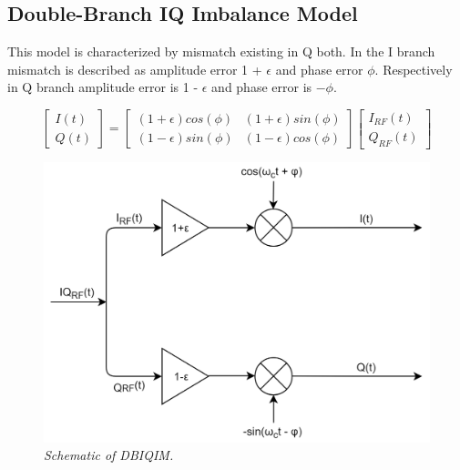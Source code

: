 \documentclass[en,printmode]{mgr}
\begin{document}
		\subsection*{Double-Branch IQ Imbalance Model}
			This model is characterized by mismatch existing in Q both. In the I branch 
			mismatch is described as amplitude error 1 + $\epsilon$ and phase error $\phi$.
			Respectively in Q branch amplitude error is 1 - $\epsilon$ and phase 
			error is $-\phi$.
			
			\vspace{1cm}
			\begin{equation}
				\begin{bmatrix}
					I(t) \\
					Q(t)
				\end{bmatrix}
				=
				\begin{bmatrix}
					(1 + \epsilon) cos(\phi) & (1 + \epsilon) sin(\phi) \\
					(1 - \epsilon) sin(\phi) & (1 - \epsilon) cos(\phi)
				\end{bmatrix}
				\begin{bmatrix}
					I_{RF}(t) \\
					Q_{RF}(t) 
				\end{bmatrix} \label{eq:DBIQIM}
			\end{equation}
			\vspace{0.5cm}
			\begin{figure}[H]
    		\centering
   				\includegraphics[width=\textwidth]{diag/dbiqm.png}
    			\caption{\textit{Schematic of DBIQIM.}}
			\end{figure}
			
\end{document}
